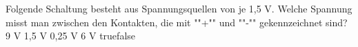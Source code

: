     {Folgende Schaltung besteht aus Spannungsquellen von je 1,5 V. Welche Spannung misst man zwischen den Kontakten, die mit ""+"" und ""-"" gekennzeichnet sind?}
    {9 V}
    {1,5 V}
    {0,25 V}
    {6 V}
    {true}{false}
